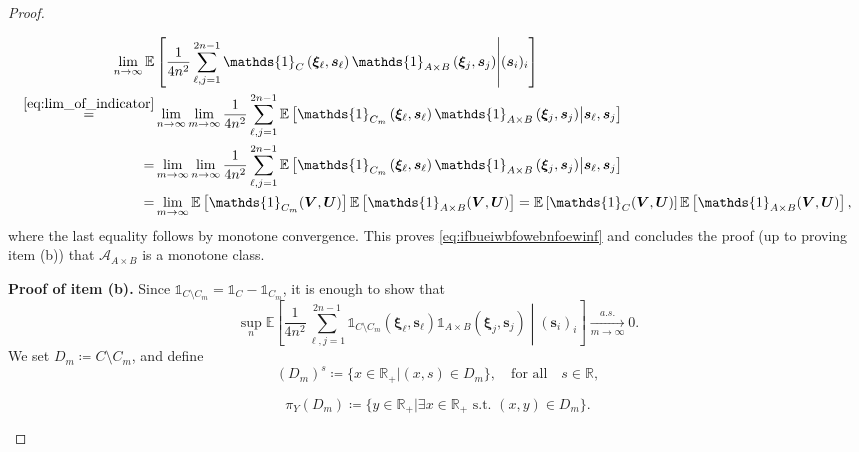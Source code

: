 \documentclass[10pt,a4paper]{amsart}
\def\E{\mathbb{E}}
\def\R{\mathbb{R}}
\begin{document}
\begin{proof}
\begin{itemize}
\begin{align}
\lim_{n\to \infty}\E&\left[\frac{1}{4n^2}\sum_{\ell,j=1}^{2n-1}\mathds{1}_{C}\left(\bm \xi_\ell,\bm s_\ell\right)\mathds{1}_{A\times B}\left(\bm \xi_j,\bm s_j\right)\middle| ( \bm s_i)_i\right]\\
\stackrel{\eqref{eq:lim_of_indicator}}{=} &\lim_{n\to \infty}\lim_{m\to \infty}
\frac{1}{4n^2}\sum_{\ell,j=1}^{2n-1}\E\left[\mathds{1}_{C_m}\left(\bm \xi_\ell,\bm s_\ell\right)\mathds{1}_{A\times B}\left(\bm \xi_j,\bm s_j\right)\middle|  \bm s_\ell,\bm s_j\right]\\
= &\lim_{m\to \infty}\lim_{n\to \infty}
\frac{1}{4n^2}\sum_{\ell,j=1}^{2n-1}\E\left[\mathds{1}_{C_m}\left(\bm \xi_\ell,\bm s_\ell\right)\mathds{1}_{A\times B}\left(\bm \xi_j,\bm s_j\right)\middle|  \bm s_\ell,\bm s_j\right]\\
=
&\lim_{m\to \infty}\E\left[\mathds{1}_{C_m}(\bm V,\bm U)\right]\E\left[\mathds{1}_{A \times B}(\bm V,\bm U)\right]=\E\left[\mathds{1}_{C}(\bm V,\bm U)\right]\E\left[\mathds{1}_{A \times B}(\bm V,\bm U)\right],
\end{align}
where the last equality follows by monotone convergence. This proves \cref{eq:ifbueiwbfowebnfoewinf} and concludes the proof (up to proving item (b)) that $\mathcal{A}_{A\times B}$ is a monotone class.

\textbf{Proof of  item (b). }Since $\mathds{1}_{C\setminus C_m}=\mathds{1}_{C}-\mathds{1}_{C_m}$, it is enough to show that
\begin{equation}
\sup_{n}\E\left[\frac{1}{4n^2}\sum_{\ell,j=1}^{2n-1}\mathds{1}_{C\setminus C_m}\left(\bm \xi_\ell,\bm s_\ell\right)\mathds{1}_{A\times B}\left(\bm \xi_j,\bm s_j\right)\middle| ( \bm s_i)_i\right]\xrightarrow[m\to\infty]{a.s.}0.
\end{equation}
We set $D_m\coloneqq C\setminus C_m$, and define 
$$(D_m)^{s}\coloneqq\{x\in \R_+|(x,s)\in D_m\},\quad \text{for all} \quad s\in\R,$$
 
$$\pi_Y(D_m)\coloneqq\{y\in \R_+| \exists x\in \R_+ \text{ s.t. }(x,y)\in D_m\}.$$ 


\end{itemize}
\end{proof}
\end{document}
